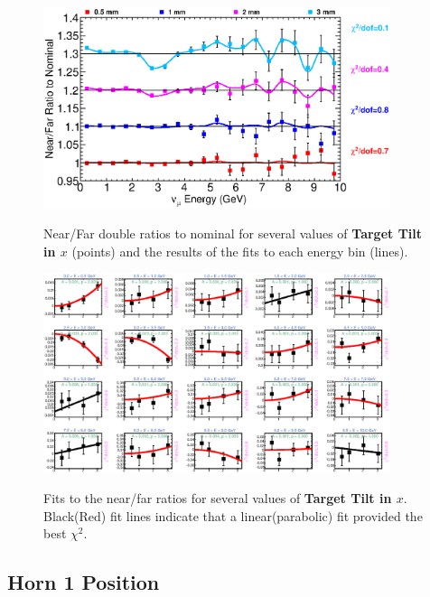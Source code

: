 \begin{figure}[ht]
  \begin{center}
    {\includegraphics[width=4.0in]{figures/TargetXTilt_nof_summary.eps}}
  \end{center}
\caption{ Near/Far double ratios to nominal for several values of {\bf Target Tilt in $x$} (points) and the results of the fits to each energy bin (lines).}
\end{figure}

\begin{figure}[hb]
  \begin{center}
    {\includegraphics[width=4.0in]{figures/TargetXTilt_nof_fits.eps}}
  \end{center}
\caption{ Fits to the near/far ratios for several values of {\bf Target Tilt in $x$}. Black(Red) fit lines indicate that a linear(parabolic) fit provided the best $\chi^2$. }
\end{figure}

\clearpage
\subsection{Horn 1 Position}

